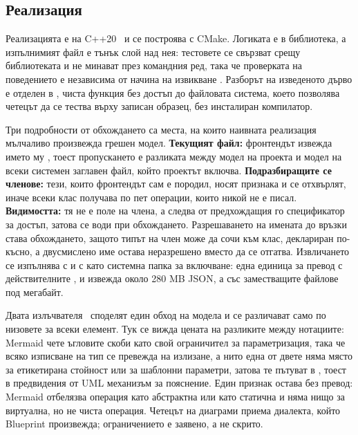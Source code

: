 \label{sec:implementation}

\subsection{Реализация}

Реализацията е на C++20~\cite{iso_cpp20} и се построява с CMake. Логиката е в библиотека, а изпълнимият
файл е тънък слой над нея: тестовете се свързват срещу библиотеката и не минават през командния ред,
така че проверката на поведението е независима от начина на извикване . Разборът на
изведеното дърво е отделен в , чиста функция без достъп до файловата система,
което позволява четецът да се тества върху записан образец, без инсталиран компилатор.

Три подробности от обхождането са места, на които наивната реализация мълчаливо произвежда грешен
модел. \textbf{Текущият файл:} фронтендът извежда името му , тоест
пропускането е разликата между модел на проекта и модел на всеки системен заглавен файл, който проектът
включва. \textbf{Подразбиращите се членове:} тези, които фронтендът сам е породил, носят признака
 и се отхвърлят, иначе всеки клас получава по пет операции, които никой не е писал.
\textbf{Видимостта:} тя не е поле на члена, а следва от предхождащия го спецификатор за достъп, затова
се води при обхождането. Разрешаването на имената до връзки става  обхождането, защото типът
на член може да сочи към клас, деклариран по-късно, а двусмислено име остава неразрешено вместо да се
отгатва. Извличането се изпълнява с  и с  като системна папка за
включване: една единица за превод с действителните ,  и 
извежда около 280 MB JSON, а със заместващите файлове под мегабайт.

Двата излъчвателя~\cite{plantuml_guide,mermaid_docs} споделят един обход на модела и се различават само
по низовете за всеки елемент. Тук се вижда цената на разликите между нотациите: Mermaid чете ъгловите
скоби като свой ограничител за параметризация, така че всяко изписване на тип се превежда на излизане,
а нито една от двете няма място за етикетирана стойност или за шаблонни параметри, затова те пътуват в
, тоест в предвидения от UML механизъм за пояснение. Един признак остава без превод:
Mermaid отбелязва операция като абстрактна или като статична и няма нищо за виртуална, но не чиста
операция. Четецът на диаграми приема диалекта, който Blueprint произвежда; ограничението е заявено, а не
скрито.


